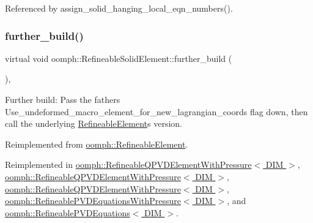 Referenced by assign\+\_\+solid\+\_\+hanging\+\_\+local\+\_\+eqn\+\_\+numbers().

\mbox{\label{classoomph_1_1RefineableSolidElement_a159967ccbb5327b2ee04154a11b1b51c}} 
\subsubsection{\texorpdfstring{further\+\_\+build()}{further\_build()}}
{\footnotesize\ttfamily virtual void oomph\+::\+Refineable\+Solid\+Element\+::further\+\_\+build (\begin{DoxyParamCaption}{ }\end{DoxyParamCaption})\hspace{0.3cm}{\ttfamily [inline]}, {\ttfamily [virtual]}}



Further build\+: Pass the father\textquotesingle{}s Use\+\_\+undeformed\+\_\+macro\+\_\+element\+\_\+for\+\_\+new\+\_\+lagrangian\+\_\+coords flag down, then call the underlying \hyperlink{classoomph_1_1RefineableElement}{Refineable\+Element}\textquotesingle{}s version. 



Reimplemented from \hyperlink{classoomph_1_1RefineableElement_a26628ce36dfad028686adeb4694a9ef3}{oomph\+::\+Refineable\+Element}.



Reimplemented in \hyperlink{classoomph_1_1RefineableQPVDElementWithPressure_ab1e141199db731d930fd5b0a70b994b3}{oomph\+::\+Refineable\+Q\+P\+V\+D\+Element\+With\+Pressure$<$ D\+I\+M $>$}, \hyperlink{classoomph_1_1RefineableQPVDElementWithPressure_ab4406f1c6de1e8e2e704bd55a9409c87}{oomph\+::\+Refineable\+Q\+P\+V\+D\+Element\+With\+Pressure$<$ D\+I\+M $>$}, \hyperlink{classoomph_1_1RefineableQPVDElementWithPressure_af2981a672382c6db25389aa7c82a6b30}{oomph\+::\+Refineable\+Q\+P\+V\+D\+Element\+With\+Pressure$<$ D\+I\+M $>$}, \hyperlink{classoomph_1_1RefineablePVDEquationsWithPressure_aad92965f2aec749e75580d003eebdc91}{oomph\+::\+Refineable\+P\+V\+D\+Equations\+With\+Pressure$<$ D\+I\+M $>$}, and \hyperlink{classoomph_1_1RefineablePVDEquations_a936bab952ddbad5093cb7ee80d0019b5}{oomph\+::\+Refineable\+P\+V\+D\+Equations$<$ D\+I\+M $>$}.



